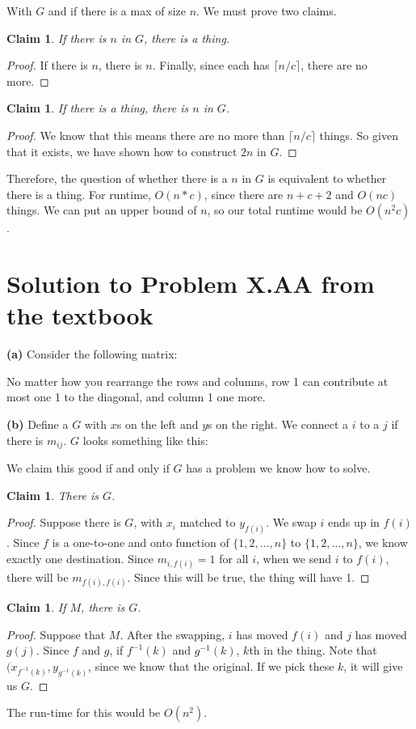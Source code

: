 \documentclass[11pt]{article}
\newtheorem{claim}[theorem]{Claim}
\begin{document}
With $G$ and if there is a max of size $n$. We must prove two claims.
\begin{claim} 
If there is $n$ in $G$, there is a thing. 
\end{claim}
\begin{proof}
If there is $n$, there is $n$. Finally, since each has $\lceil n/c \rceil$, there are no more.
\end{proof}


\begin{claim} 
If there is a thing, there is $n$ in $G$. 
\end{claim}
\begin{proof}
We know that this means there are no more than $\lceil n/c \rceil$ things. So given that it exists, we have shown how to construct $2n$ in $G$.
\end{proof}
Therefore, the question of whether there is a $n$ in $G$ is equivalent to whether there is a thing. For runtime, $O(n*c)$, since there are $n+c+2$ and $O(nc)$ things. We can put an upper bound of $n$, so our total runtime would be $O(n^{2}c)$.


\section*{Solution to Problem X.AA from the textbook}

\textbf{(a)} Consider the following matrix:


No matter how you rearrange the rows and columns, row 1 can contribute at most one 1 to the diagonal, and column 1 one more.

\textbf{(b)}
Define a $G$ with $x$s on the left and $y$s on the right. We connect a $i$ to a $j$ if there is $m_{ij}$. $G$ looks something like this:


We claim this good if and only if $G$ has a problem we know how to solve.
\begin{claim} 
There is $G$. 
\end{claim}
\begin{proof}
Suppose there is $G$, with $x_{i}$ matched to $y_{f(i)}$. We swap $i$ ends up in $f(i)$. Since $f$ is a one-to-one and onto function of $\{1,2,\ldots,n\}$ to $\{1,2,\ldots,n\}$, we know exactly one destination. Since $m_{i,f(i)} = 1$ for all $i$, when we send $i$ to $f(i)$, there will be $m_{f(i),f(i)}$. Since this will be true, the thing will have 1.
\end{proof}
\begin{claim} 
If $M$, there is $G$. 
\end{claim}
\begin{proof}
Suppose that $M$. After the swapping, $i$ has moved $f(i)$ and $j$ has moved $g(j)$. Since $f$ and $g$, if $f^{-1}(k)$ and $g^{-1}(k)$, $k$th in the thing. Note that $(x_{f^{-1}(k)}, y_{g^{-1}(k)}$, since we know that the original. If we pick these $k$, it will give us $G$. 
\end{proof}

The run-time for this would be $O(n^2)$.
\end{document}
